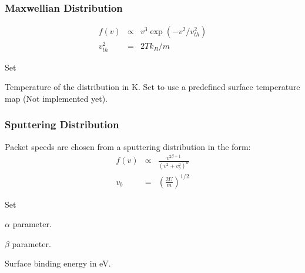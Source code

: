 \documentclass[letterpaper,10pt,english]{sphinxmanual}
\begin{document}
\subsubsection{Maxwellian Distribution}
\label{\detokenize{nexoclom2/inputfiles:maxwellian-distribution}}\label{\detokenize{nexoclom2/inputfiles:maxwellianspeeddist}}\begin{eqnarray*}
f(v) & \propto & v^3 \exp(-v^2/v_{th}^2) \\
v_{th}^2 & = & 2Tk_B/m
\end{eqnarray*}\begin{description}
\sphinxAtStartPar
Set 

\sphinxAtStartPar
Temperature of the distribution in K. Set  to
use a pre\sphinxhyphen{}defined surface temperature map (Not implemented yet).

\end{description}


\subsubsection{Sputtering Distribution}
\label{\detokenize{nexoclom2/inputfiles:sputtering-distribution}}\label{\detokenize{nexoclom2/inputfiles:sputterspeeddist}}
\sphinxAtStartPar
Packet speeds are chosen from a sputtering distribution in the form:
\begin{eqnarray*}
f(v) & \propto & \frac{v^{2\beta + 1}}{(v^2 + v_b^2)^\alpha} \\
v_b & = & \left(\frac{2U}{m} \right)^{1/2}
\end{eqnarray*}\begin{description}
\sphinxAtStartPar
Set 

\sphinxAtStartPar
\(\alpha\) parameter.

\sphinxAtStartPar
\(\beta\) parameter.

\sphinxAtStartPar
Surface binding energy in eV.

\end{description}
\end{document}
